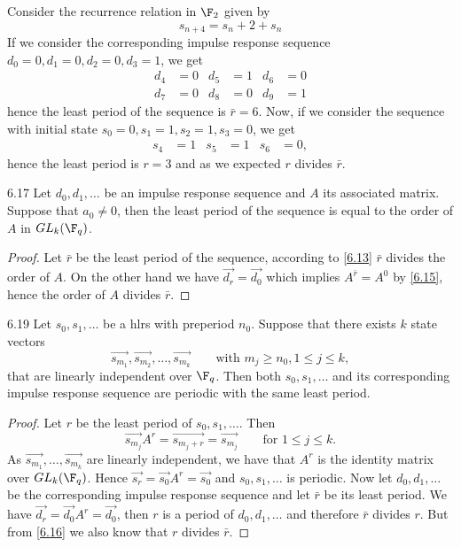 \begin{ese}
	Consider the recurrence relation in \(\F_2\) given by
	\[
		s_{n+4} = s_n+2 + s_n 
	\]
	If we consider the corresponding impulse response sequence \(d_0=0,d_1=0,d_2=0,d_3=1\), we get
	\begin{align*}
		d_4 & = 0 & d_5 & = 1 & d_6 & = 0  \\
		d_7 & = 0 & d_8 & =0  & d_9 & = 1
	\end{align*}
	hence the least period of the sequence is \(\bar{r}=6\).
	Now, if we consider the sequence with initial state \(s_0=0,s_1=1,s_2=1,s_3=0\), we get
	\begin{align*}
		s_4 & = 1 & s_5 & = 1 & s_6 & =0,
	\end{align*}
	hence the least period is \(r=3\) and as we expected \(r\) divides \(\bar{r}\).
\end{ese}

\begin{teor}{}{6.17}
	Let \(d_0,d_1,\ldots\) be an impulse response sequence and \(A\) its associated matrix. Suppose that \(a_0\neq 0\), then the least period of the sequence is equal to the order of \(A\) in \(GL_k(\F_q)\).
\end{teor}

\begin{proof}
	Let \(\bar{r}\) be the least period of the sequence, according to \autoref{6.13} \(\bar{r}\) divides the order of \(A\). On the other hand we have \(\vec{d_r}=\vec{d_0}\) which implies \(A^{\bar{r}} = A^0\) by \autoref{6.15}, hence the order of \(A\) divides \(\bar{r}\).
\end{proof}

\begin{teor}{}{6.19}
	Let \(s_0,s_1,\ldots\) be a hlrs with preperiod \(n_0\). Suppose that there exists \(k\) state vectors
	\[
		\vec{s_{m_1}},\vec{s_{m_2}},\ldots,\vec{s_{m_k}} \qquad\text{with }m_j \ge n_0, 1 \le j \le k,
	\]
	that are linearly independent  over \(\F_q\). Then both \(s_0,s_1,\ldots\) and its corresponding impulse response sequence are periodic with the same least period.
\end{teor}

\begin{proof}
	Let \(r\) be the least period of \(s_0,s_1,\ldots\). Then
	\[
		\vec{s_{m_j}}A^r = \vec{s_{m_j+r}} = \vec{s_{m_j}} \qquad\text{for }1 \le j \le k.
	\]
	As \(\vec{s_{m_1}},\ldots,\vec{s_{m_k}}\) are linearly independent, we have that \(A^r\) is the identity matrix over \(GL_k(\F_q)\). Hence \(\vec{s_r} = \vec{s_0}A^r = \vec{s_0}\) and \(s_0,s_1,\ldots\) is periodic.
	Now let \(d_0,d_1,\ldots\) be the corresponding impulse response sequence and let \(\bar{r}\) be its least period. We have \(\vec{d_r} = \vec{d_0}A^r = \vec{d_0}\), then \(r\) is a period of \(d_0,d_1,\ldots\) and therefore \(\bar{r}\) divides \(r\). But from \autoref{6.16} we also know that \(r\) divides \(\bar{r}\).
\end{proof}

